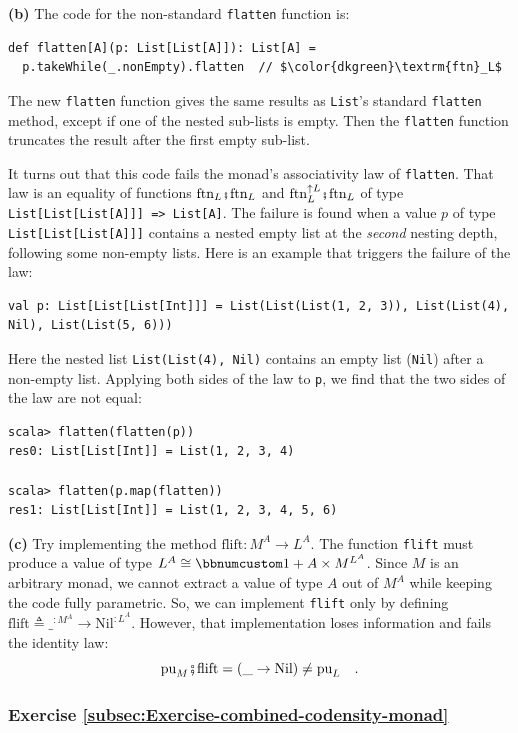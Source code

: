 \textbf{(b)} The code for the non-standard \lstinline!flatten! function
is:
\begin{lstlisting}[mathescape=true]
def flatten[A](p: List[List[A]]): List[A] =
  p.takeWhile(_.nonEmpty).flatten  // $\color{dkgreen}\textrm{ftn}_L$
\end{lstlisting}
The new \lstinline!flatten! function gives  the same results as \lstinline!List!\textsf{'}s
standard \lstinline!flatten! method, except if one of the nested
sub-lists is empty. Then the \lstinline!flatten! function truncates
the result after the first empty sub-list.

It turns out that this code fails the monad\textsf{'}s associativity law of
\lstinline!flatten!. That law is an equality of functions $\text{ftn}_{L}\bef\text{ftn}_{L}$
and $\text{ftn}_{L}^{\uparrow L}\bef\text{ftn}_{L}$ of type \lstinline!List[List[List[A]]] => List[A]!.
The failure is found when a value $p$ of type \lstinline!List[List[List[A]]]!
contains a nested empty list at the \emph{second} nesting depth, following
some non-empty lists. Here is an example that triggers the failure
of the law:
\begin{lstlisting}
val p: List[List[List[Int]]] = List(List(List(1, 2, 3)), List(List(4), Nil), List(List(5, 6)))
\end{lstlisting}
Here the nested list \lstinline!List(List(4), Nil)! contains an empty
list (\lstinline!Nil!) after a non-empty list. Applying both sides
of the law to \lstinline!p!, we find that the two sides of the law
are not equal:
\begin{lstlisting}
scala> flatten(flatten(p))
res0: List[List[Int]] = List(1, 2, 3, 4)

scala> flatten(p.map(flatten))
res1: List[List[Int]] = List(1, 2, 3, 4, 5, 6)
\end{lstlisting}

\textbf{(c)} Try implementing the method $\text{flift}:M^{A}\rightarrow L^{A}$.
The function \lstinline!flift! must produce a value of type $L^{A}\cong\bbnum 1+A\times M^{L^{A}}$.
Since $M$ is an arbitrary monad, we cannot extract a value of type
$A$ out of $M^{A}$ while keeping the code fully parametric. So,
we can implement \lstinline!flift! only by defining $\text{flift}\triangleq\_^{:M^{A}}\rightarrow\text{Nil}^{:L^{A}}$.
However, that implementation loses information and fails the identity
law:
\[
\text{pu}_{M}\bef\text{flift}=(\_\rightarrow\text{Nil})\neq\text{pu}_{L}\quad.
\]


\subsubsection*{Exercise \ref{subsec:Exercise-combined-codensity-monad}}

